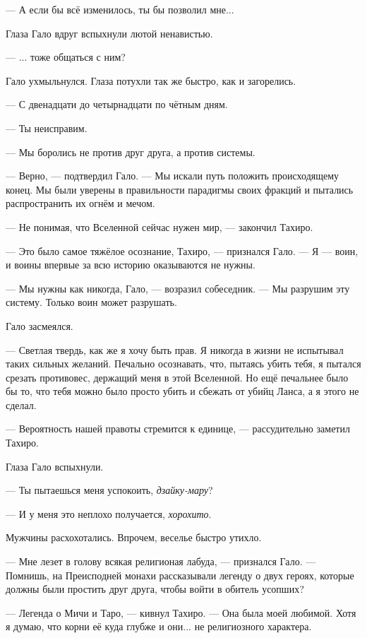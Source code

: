 --- А если бы всё изменилось, ты бы позволил мне...

Глаза Гало вдруг вспыхнули лютой ненавистью.

--- ... тоже общаться с ним?

Гало ухмыльнулся.
Глаза потухли так же быстро, как и загорелись.

--- С двенадцати до четырнадцати по чётным дням.

--- Ты неисправим.

\textspace

--- Мы боролись не против друг друга, а против системы.

--- Верно, --- подтвердил Гало.
--- Мы искали путь положить происходящему конец.
Мы были уверены в правильности парадигмы своих фракций и пытались распространить их огнём и мечом.

--- Не понимая, что Вселенной сейчас нужен мир, --- закончил Тахиро.

--- Это было самое тяжёлое осознание, Тахиро, --- признался Гало.
--- Я --- воин, и воины впервые за всю историю оказываются не нужны.

--- Мы нужны как никогда, Гало, --- возразил собеседник.
--- Мы разрушим эту систему.
Только воин может разрушать.

Гало засмеялся.

--- Светлая твердь, как же я хочу быть прав.
Я никогда в жизни не испытывал таких сильных желаний.
Печально осознавать, что, пытаясь убить тебя, я пытался срезать противовес, держащий меня в этой Вселенной.
Но ещё печальнее было бы то, что тебя можно было просто убить и сбежать от убийц Ланса, а я этого не сделал.

--- Вероятность нашей правоты стремится к единице, --- рассудительно заметил Тахиро.

Глаза Гало вспыхнули.

--- Ты пытаешься меня успокоить, \emph{дзайку-мару}?

--- И у меня это неплохо получается, \emph{хорохито}.

Мужчины расхохотались.
Впрочем, веселье быстро утихло.

--- Мне лезет в голову всякая религионая лабуда, --- признался Гало.
--- Помнишь, на Преисподней монахи рассказывали легенду о двух героях, которые должны были простить друг друга, чтобы войти в обитель усопших?

--- Легенда о Мичи и Таро, --- кивнул Тахиро.
--- Она была моей любимой.
Хотя я думаю, что корни её куда глубже и они... не религиозного характера.

